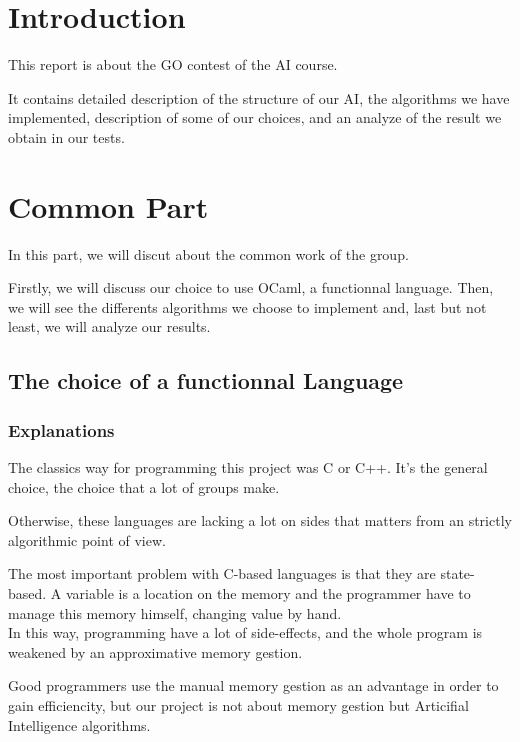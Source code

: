 

\tableofcontents

\chapter*{Introduction}

This report is about the GO contest of the AI course.

It contains detailed description of the structure of our AI, the algorithms we have implemented, description of some of our choices, and an analyze of the result we obtain in our tests.

\chapter{Common Part}

In this part, we will discut about the common work of the group.

Firstly, we will discuss our choice to use OCaml, a functionnal language.
Then, we will see the differents algorithms we choose to implement and, last but not least, we will analyze our results.

\section{The choice of a functionnal Language}

\subsection{Explanations}

The classics way for programming this project was C or C++. It's the general choice, the choice that a lot of groups make.

Otherwise, these languages are lacking a lot on sides that matters from an strictly algorithmic point of view.

The most important problem with C-based languages is that they are state-based. A variable is a location on the memory and the programmer have to manage this memory himself, changing value by hand.\\

In this way, programming have a lot of side-effects, and the whole program is weakened by  an approximative memory gestion.

Good programmers use the manual memory gestion as an advantage in order to gain efficiencity, but our project is not about memory gestion but Articifial Intelligence algorithms.\\

